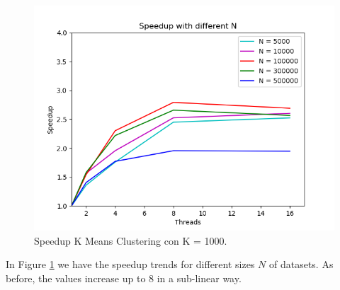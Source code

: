 \documentclass[10pt,twocolumn,letterpaper]{article}
\begin{document}
\begin{figure}[H]
	\includegraphics[width=\linewidth]{images/speedup_by_n.png}
	\caption{Speedup K Means Clustering con K = 1000.}
	\label{fig:speedup_n}
\end{figure}

In Figure \ref{fig:speedup_n} we have the speedup trends for different sizes $N$ of datasets. As before, the values increase up to 8 in a sub-linear way.
\end{document}
